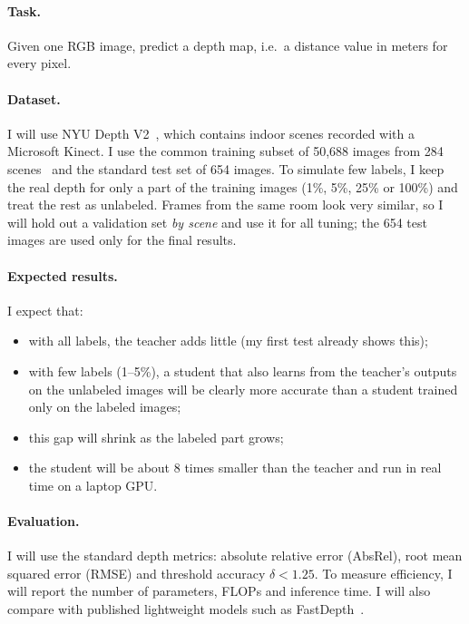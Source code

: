 \documentclass[11pt]{article}
\begin{document}
\paragraph{Task.} Given one RGB image, predict a depth map, i.e.\ a distance
value in meters for every pixel.

\paragraph{Dataset.} I will use NYU Depth V2~\cite{silberman2012}, which
contains indoor scenes recorded with a Microsoft Kinect. I use the common
training subset of 50,688 images from 284 scenes~\cite{alhashim2018} and the
standard test set of 654 images. To simulate few labels, I keep the real depth
for only a part of the training images (1\%, 5\%, 25\% or 100\%) and treat the
rest as unlabeled. Frames from the same room look very similar, so I will hold
out a validation set \emph{by scene} and use it for all tuning; the 654 test
images are used only for the final results.

\paragraph{Expected results.} I expect that:
\begin{itemize}
  \item with all labels, the teacher adds little (my first test already shows this);
  \item with few labels (1--5\%), a student that also learns from the teacher's
        outputs on the unlabeled images will be clearly more accurate than a
        student trained only on the labeled images;
  \item this gap will shrink as the labeled part grows;
  \item the student will be about 8 times smaller than the teacher and run in
        real time on a laptop GPU.
\end{itemize}

\paragraph{Evaluation.} I will use the standard depth metrics: absolute
relative error (AbsRel), root mean squared error (RMSE) and threshold accuracy
$\delta < 1.25$. To measure efficiency, I will report the number of
parameters, FLOPs and inference time. I will also compare with published
lightweight models such as FastDepth~\cite{wofk2019}.
\end{document}
